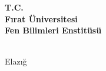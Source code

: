 \documentclass[a4paper,12pt,oneside]{report}
\begin{document}
\begin{titlepage}
\begin{center}
\textbf{T.C.}\\
\textbf{Fırat Üniversitesi}\\
\textbf{Fen Bilimleri Enstitüsü}

\vspace{3cm}

{\Large\bfseries \tezbasligi}

\vspace{2cm}

{\large \tezyazari}

\vspace{1cm}

{\large \derece}

\vfill

\ay\ \yil\\
Elazığ
\end{center}
\end{titlepage}

\tableofcontents
\newpage











\end{document}
